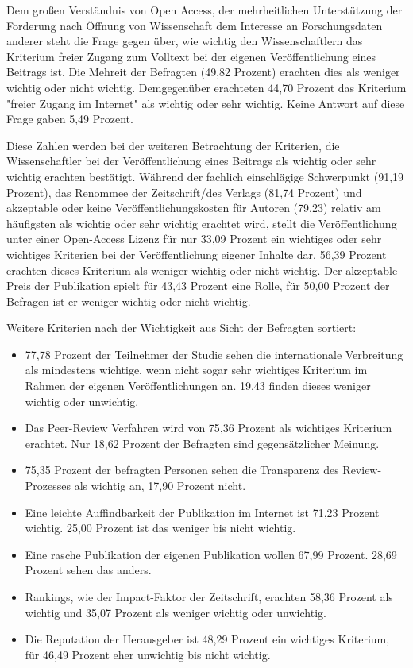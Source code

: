 Dem großen Verständnis von Open Access, der mehrheitlichen Unterstützung der Forderung nach Öffnung von Wissenschaft dem Interesse an Forschungsdaten anderer steht die Frage gegen über, wie wichtig den Wissenschaftlern das Kriterium freier Zugang zum Volltext bei der eigenen Veröffentlichung eines Beitrags ist. Die Mehreit der Befragten (49,82 Prozent) erachten dies als weniger wichtig oder nicht wichtig. Demgegenüber erachteten 44,70 Prozent das Kriterium "freier Zugang im Internet" als wichtig oder sehr wichtig. Keine Antwort auf diese Frage gaben 5,49 Prozent.

Diese Zahlen werden bei der weiteren Betrachtung der Kriterien, die Wissenschaftler bei der Veröffentlichung eines Beitrags als wichtig oder sehr wichtig erachten bestätigt. Während der fachlich einschlägige Schwerpunkt (91,19 Prozent), das Renommee der Zeitschrift/des Verlags (81,74 Prozent) und akzeptable oder keine Veröffentlichungskosten für Autoren (79,23) relativ am häufigsten als wichtig oder sehr wichtig erachtet wird, stellt die Veröffentlichung unter einer Open-Access Lizenz für nur 33,09 Prozent ein wichtiges oder sehr wichtiges Kriterien bei der Veröffentlichung eigener Inhalte dar. 56,39 Prozent erachten dieses Kriterium als weniger wichtig oder nicht wichtig. Der akzeptable Preis der Publikation spielt für 43,43 Prozent eine Rolle, für 50,00 Prozent der Befragen ist er weniger wichtig oder nicht wichtig.

Weitere Kriterien nach der Wichtigkeit aus Sicht der Befragten sortiert:
\begin{itemize}
\item 77,78 Prozent der Teilnehmer der Studie sehen die internationale Verbreitung als mindestens wichtige, wenn nicht sogar sehr wichtiges Kriterium im Rahmen der eigenen Veröffentlichungen an. 19,43 finden dieses weniger wichtig oder unwichtig.
\item Das Peer-Review Verfahren wird von 75,36 Prozent als wichtiges Kriterium erachtet. Nur 18,62 Prozent der Befragten sind gegensätzlicher Meinung.
\item 75,35 Prozent der befragten Personen sehen die Transparenz des Review-Prozesses als wichtig an, 17,90 Prozent nicht.
\item Eine leichte Auffindbarkeit der Publikation im Internet ist 71,23 Prozent wichtig. 25,00 Prozent ist das weniger bis nicht wichtig.
\item Eine rasche Publikation der eigenen Publikation wollen 67,99 Prozent. 28,69 Prozent sehen das anders.
\item Rankings, wie der Impact-Faktor der Zeitschrift, erachten 58,36 Prozent als wichtig und 35,07 Prozent als weniger wichtig oder unwichtig.
\item Die Reputation der Herausgeber ist 48,29 Prozent ein wichtiges Kriterium, für 46,49 Prozent eher unwichtig bis nicht wichtig.
\end{itemize}

